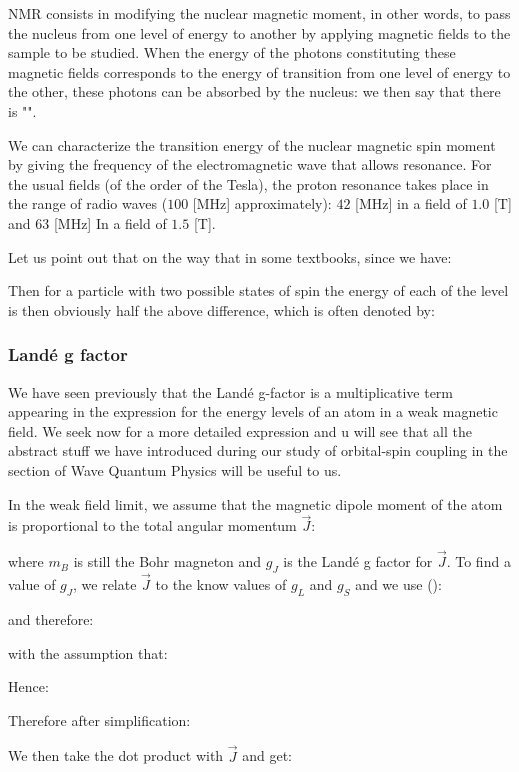 	NMR consists in modifying the nuclear magnetic moment, in other words, to pass the nucleus from one level of energy to another by applying magnetic fields to the sample to be studied. When the energy of the photons constituting these magnetic fields corresponds to the energy of transition from one level of energy to the other, these photons can be absorbed by the nucleus: we then say that there is "".
	
	We can characterize the transition energy of the nuclear magnetic spin moment by giving the frequency of the electromagnetic wave that allows resonance. For the usual fields (of the order of the Tesla), the proton resonance takes place in the range of radio waves ($100$ [MHz] approximately): $42$ [MHz] in a field of $1.0$ [T] and $63$ [MHz] In a field of $1.5$ [T].
	
	Let us point out that on the way that in some textbooks, since we have:
	
	Then for a particle with two possible states of spin the energy of each of the level is then obviously half the above difference, which is often denoted by:
	
	
	\subsubsection{Landé g factor}
	We have seen previously that the Landé g-factor is a multiplicative term appearing in the expression for the energy levels of an atom in a weak magnetic field. We seek now for a more detailed expression and u will see that all the abstract stuff we have introduced during our study of orbital-spin coupling in the section of Wave Quantum Physics will be useful to us.
	
	In the weak field limit, we assume that the magnetic dipole moment of the atom is proportional to the total angular momentum $\vec{J}$:
	
	where $m_B$ is still the Bohr magneton and $g_J$ is the Landé g factor for $\vec{J}$. To find a value of $g_J$, we relate $\vec{J}$ to the know values of $g_L$ and $g_S$ and we use ():
	
	and therefore:
	
	with the assumption that:
	
	Hence:
	
	Therefore after simplification:
	
	We then take the dot product with $\vec{J}$ and get:
	
